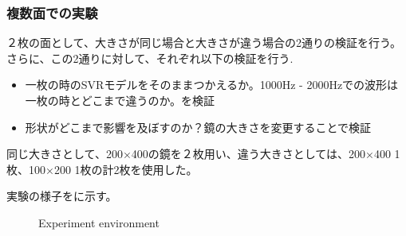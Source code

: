 \subsubsection{複数面での実験}
\label{sec:app_exp_multi_set}

２枚の面として、大きさが同じ場合と大きさが違う場合の2通りの検証を行う。
さらに、この2通りに対して、それぞれ以下の検証を行う.

\begin{itemize}
    \item 一枚の時のSVRモデルをそのままつかえるか。1000Hz - 2000Hzでの波形は一枚の時とどこまで違うのか。を検証
    \item 形状がどこまで影響を及ぼすのか？鏡の大きさを変更することで検証
\end{itemize}

同じ大きさとして、200×400の鏡を２枚用い、違う大きさとしては、200×400 1枚、100×200 1枚の計2枚を使用した。

実験の様子をに示す。

\begin{figure}[tb]
    \centering
    \label{fig:app_exp_multi_env_same}
    \label{fig:app_exp_multi_env_different}
    \caption{Experiment environment}
    \label{fig:app_exp_multi_env}
\end{figure}

